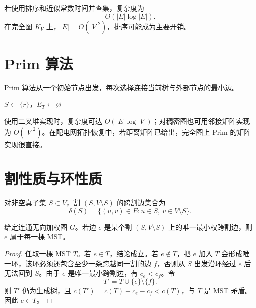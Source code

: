若使用排序和近似常数时间并查集，复杂度为
\begin{equation}
  O(|E|\log |E|).
\end{equation}
在完全图 $K_V$ 上，$|E|=O(|V|^2)$，排序可能成为主要开销。

\section{Prim 算法}

Prim 算法从一个初始节点出发，每次选择连接当前树与外部节点的最小边。

\begin{algorithm}[htbp]
  \caption{Prim 最小生成树算法}
  \label{alg:prim}
  $S\leftarrow\{r\}$，$E_T\leftarrow\varnothing$\;
\end{algorithm}

使用二叉堆实现时，复杂度可达 $O(|E|\log |V|)$；对稠密图也可用邻接矩阵实现为 $O(|V|^2)$。在配电网拓扑恢复中，若距离矩阵已给出，完全图上 Prim 的矩阵实现很直接。

\section{割性质与环性质}

\begin{definition}[割与跨割边]
对非空真子集 $S\subset V$，割 $(S,V\setminus S)$ 的跨割边集合为
\begin{equation}
  \delta(S)=\{(u,v)\in E:u\in S,\ v\in V\setminus S\}.
\end{equation}
\end{definition}

\begin{theorem}
\label{thm:cut_property}
给定连通无向加权图 $G$。若边 $e$ 是某个割 $(S,V\setminus S)$ 上的唯一最小权跨割边，则 $e$ 属于每一棵 MST。
\end{theorem}

\begin{proof}
任取一棵 MST $T$。若 $e\in T$，结论成立。若 $e\notin T$，把 $e$ 加入 $T$ 会形成唯一环，该环必须还包含至少一条跨越同一割的边 $f$，否则从 $S$ 出发沿环经过 $e$ 后无法回到 $S$。由于 $e$ 是唯一最小跨割边，有 $c_e<c_f$。令
\begin{equation}
  T'=T\cup\{e\}\setminus\{f\}.
\end{equation}
则 $T'$ 仍为生成树，且 $c(T')=c(T)+c_e-c_f<c(T)$，与 $T$ 是 MST 矛盾。因此 $e\in T$。
\end{proof}

